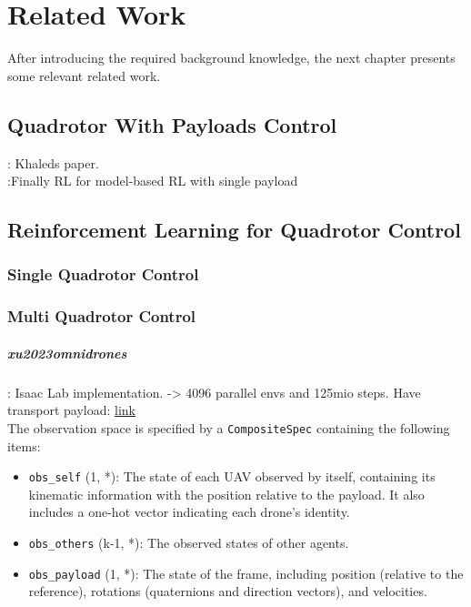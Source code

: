 \chapter{Related Work}
After introducing the required background knowledge, the next chapter presents some relevant related work.
\section{Quadrotor With Payloads Control}
\autocite{Wahba2024}: Khaleds paper.\\

\autocite{Belkhale2021}:Finally RL for model-based RL with single payload 
\section{Reinforcement Learning for Quadrotor Control}
\subsection{Single Quadrotor Control}

\subsection{Multi Quadrotor Control}


\paragraph{xu2023omnidrones}
\autocite{xu2023omnidrones}: Isaac Lab implementation. -> 4096 parallel envs and 125mio steps. Have transport payload: 
\href{https://omnidrones.readthedocs.io/en/latest/tasks/multi/TransportTrack.html#transporttrack}{link} \\

The observation space is specified by a \texttt{CompositeSpec} containing the following items:
\begin{itemize}
    \item \texttt{obs\_self} (1, *): The state of each UAV observed by itself, containing its kinematic information with the position relative to the payload. It also includes a one-hot vector indicating each drone’s identity.
    \item \texttt{obs\_others} (k-1, *): The observed states of other agents.
    \item \texttt{obs\_payload} (1, *): The state of the frame, including position (relative to the reference), rotations (quaternions and direction vectors), and velocities.
\end{itemize}


